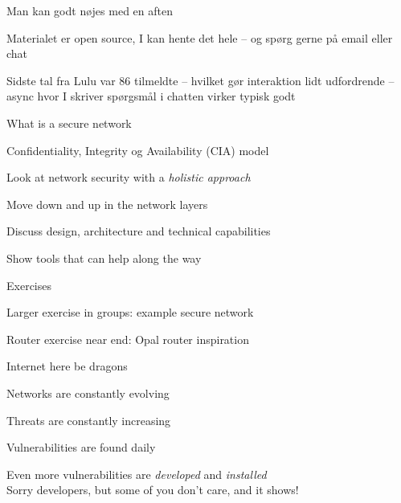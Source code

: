 \documentclass[Screen16to9,17pt]{foils}
\begin{document}
\begin{list2}
\item Man kan godt nøjes med en aften
\item Materialet er open source, I kan hente det hele -- og spørg gerne på email eller chat
\item Sidste tal fra Lulu var 86 tilmeldte -- hvilket gør interaktion lidt udfordrende -- async hvor I skriver spørgsmål i chatten virker typisk godt
\end{list2}




\begin{list2}
\item What is a secure network
\item Confidentiality, Integrity og Availability (CIA) model
\item Look at network security with a \emph{holistic approach}
\item Move down and up in the network layers
\item Discuss design, architecture and technical capabilities
\item Show tools that can help along the way

\end{list2}

Exercises
\begin{list2}
\item Larger exercise in groups: example secure network
\item Router exercise near end: Opal router inspiration
\end{list2}




\centerline{\Large Internet here be dragons}

\begin{list2}
\item Networks are constantly evolving
\item Threats are constantly increasing
\item Vulnerabilities are found daily
\item Even more vulnerabilities are \emph{developed} and \emph{installed}\\
Sorry developers, but some of you don't care, and it shows!
\end{list2}
\end{document}
